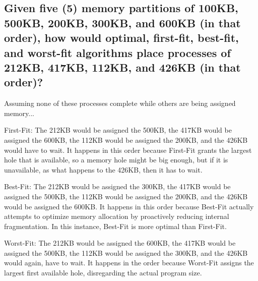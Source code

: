 \documentclass[letterpaper, 10pt,DIV=13]{scrartcl}
\numberwithin{equation}{section} %
\numberwithin{figure}{section} %
\numberwithin{table}{section} %
\begin{document}
\subsection{Given five (5) memory partitions of 100KB, 500KB, 200KB, 300KB, and 600KB (in that order), how would optimal, first-fit, best-fit, and worst-fit algorithms place processes of 212KB, 417KB, 112KB, and 426KB (in that order)?}
\par
Assuming none of these processes complete while others are being assigned memory...
\par
First-Fit: The 212KB would be assigned the 500KB, the 417KB would be assigned the 600KB, the 112KB would be assigned the 200KB, and the 426KB would have to wait. It happens in this order because First-Fit grants the largest hole that is available, so a memory hole might be big enough, but if it is unavailable, as what happens to the 426KB, then it has to wait.
\par
Best-Fit: The 212KB would be assigned the 300KB, the 417KB would be assigned the 500KB, the 112KB would be assigned the 200KB, and the 426KB would be assigned the 600KB. It happens in this order because Best-Fit actually attempts to optimize memory allocation by proactively reducing internal fragmentation. In this instance, Best-Fit is more optimal than First-Fit.
\par
Worst-Fit: The 212KB would be assigned the 600KB, the 417KB would be assigned the 500KB, the 112KB would be assigned the 300KB, and the 426KB would again, have to wait. It happens in the order because Worst-Fit assigns the largest first available hole, disregarding the actual program size.



\pagebreak
\end{document}
